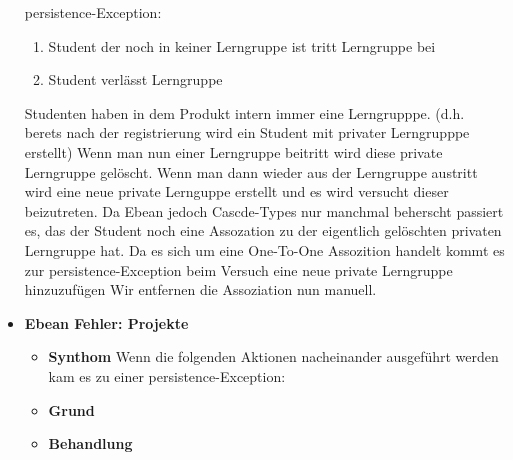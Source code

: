 \documentclass[parskip=full]{scrartcl}
\newcommand{\fehler}[4]{\textbf{#1}
 							\begin{itemize}
 							  \item \textbf{Synthom}  #2
 							  \item \textbf{Grund} #3
 							  \item \textbf{Behandlung} #4
 							\end{itemize}}
\begin{document}
\begin{itemize}
{persistence-Exception:\begin{enumerate}
  \item Student der noch in keiner Lerngruppe ist tritt Lerngruppe bei
  \item Student verlässt Lerngruppe
\end{enumerate}}{Studenten haben in dem Produkt intern immer eine Lerngrupppe.
(d.h.
berets nach der registrierung wird ein Student mit privater Lerngrupppe
erstellt) Wenn man nun einer Lerngruppe beitritt wird diese private Lerngruppe
gelöscht. Wenn man dann wieder aus der Lerngruppe austritt wird eine neue
private Lernguppe erstellt und es wird versucht dieser beizutreten. Da Ebean
jedoch Cascde-Types nur manchmal beherscht passiert es, das der Student noch
eine Assozation zu der eigentlich gelöschten privaten Lerngruppe hat. Da es sich
um eine One-To-One Assozition handelt kommt es zur persistence-Exception beim
Versuch eine neue private Lerngruppe hinzuzufügen }{Wir entfernen die
Assoziation nun manuell.}
\item \fehler{Ebean Fehler: Projekte}{Wenn die folgenden Aktionen
nacheinander ausgeführt werden kam es zu einer persistence-Exception:}{}{}
\end{itemize}
\end{document}
